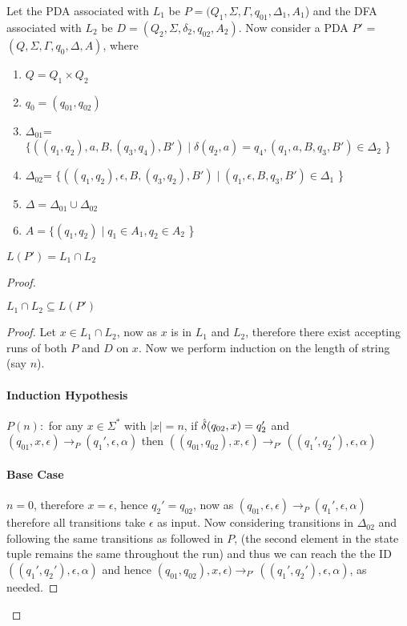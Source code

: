 \begin{soln}

Let the PDA associated with $L_1$ be $P=(Q_1,\Sigma,\Gamma,q_{01},\Delta_1,A_1$) and the DFA associated with $L_2$ be $D=(Q_2,\Sigma,\delta_2,q_{02},A_2)$.\nl
Now consider a PDA $P'$ = $(Q,\Sigma,\Gamma,q_0,\Delta,A)$, where
\begin{enumerate}
\item $Q=Q_1 \times Q_2$
\item $q_0=(q_{01},q_{02})$
\item $\Delta_{01}$=  $\{( (q_1,q_2),a,B,(q_3,q_4),B') \mid \delta(q_2,a)=q_4  , (q_1,a,B,q_3,B') \in \Delta_2$  \}
\item $\Delta_{02}$=  $\{( (q_1,q_2),\epsilon,B,(q_3,q_2),B') \mid  (q_1,\epsilon,B,q_3,B') \in \Delta_1$  \}
\item $\Delta = \Delta_{01} \cup \Delta_{02} $
\item $A=\{(q_1,q_2) \mid q_1 \in A_1, q_2 \in A_2$ \}
\end{enumerate}

\begin{claim}
$L(P')=L_1 \cap L_2$
\end{claim}
\begin{proof}


\begin{claim}
$  L_1 \cap L_2 \subseteq L(P')$
\end{claim}
\begin{proof}
Let $x \in L_1 \cap L_2$, now as $x$ is in $L_1$ and $L_2$, therefore there exist accepting runs of both $P$ and $D$ on $x$.\nl
Now we perform induction on the length of string (say $n$).
\paragraph{Induction Hypothesis}
$P(n):$ for any $x \in \Sigma^*$ with $|x|=n$, if $\hat{\delta}(q_{02},x)=q_2'$ and $( q_{01},x,\epsilon) \to_{P} (q_1',\epsilon,\alpha)$ then $((q_{01},q_{02}),x,\epsilon) \to_{P'} ((q_1',q_2'),\epsilon,\alpha)$
\paragraph{Base Case} $n=0$, therefore $x=\epsilon$, hence $q_2'=q_{02}$, now as $( q_{01},\epsilon,\epsilon) \to_{P} (q_1',\epsilon,\alpha)$ therefore all transitions take $\epsilon$ as input. Now
considering transitions in $\Delta_{02}$ and following the same transitions as followed in $P$, (the second element in the state tuple remains the same throughout the run) and thus we can reach the
the ID $((q_1',q_2'),\epsilon,\alpha)$ and hence $(q_{01},q_{02}),x,\epsilon) \to_{P'} ((q_1',q_2'),\epsilon,\alpha)$, as needed.


\end{proof}
\end{proof}
\end{soln}
